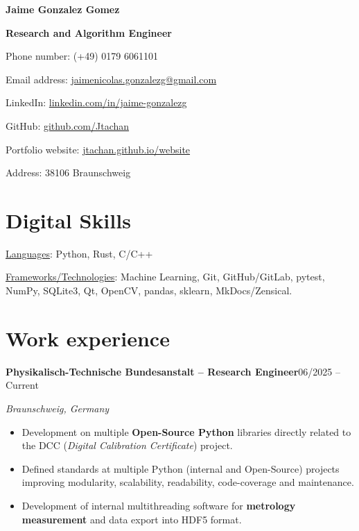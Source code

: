 \documentclass[10pt,a4paper]{article}
\newcommand{\link}[2]{\href{#1}{\textcolor{linkblue}{#2}}}
\newcommand{\entry}[3]{%
  \vspace{0.7em}%
  \textbf{#2}\hfill #1\par
  \textit{#3}\par\vspace{0.1em}}
\begin{document}
{\Large\bfseries Jaime Gonzalez Gomez}\par
{\large\bfseries Research and Algorithm Engineer}\par
\vspace{0.6em}

\begin{minipage}[t]{0.55\textwidth}
Phone number: (+49) 0179 6061101\par
Email address: \link{mailto:jaimenicolas.gonzalezg@gmail.com}{jaimenicolas.gonzalezg@gmail.com}\par
LinkedIn: \link{https://www.linkedin.com/in/jaime-gonzalezg/}{linkedin.com/in/jaime-gonzalezg}
\end{minipage}%
\begin{minipage}[t]{0.45\textwidth}
GitHub: \link{https://github.com/Jtachan}{github.com/Jtachan}\par
Portfolio website: \link{https://jtachan.github.io/website/}{jtachan.github.io/website}\par
Address: 38106 Braunschweig
\end{minipage}

\section{Digital Skills}
\underline{Languages}: Python, Rust, C/C++\par\vspace{0.25em}
\underline{Frameworks/Technologies}: Machine Learning, Git, GitHub/GitLab, pytest, NumPy, SQLite3, Qt, OpenCV, pandas, sklearn, MkDocs/Zensical.

\section{Work experience}

\entry{06/2025 -- Current}{Physikalisch-Technische Bundesanstalt -- Research Engineer}{Braunschweig, Germany}
\begin{itemize}
  \item Development on multiple \textbf{Open-Source Python} libraries directly related to the DCC (\textit{Digital Calibration Certificate}) project.
  \item Defined standards at multiple Python (internal and Open-Source) projects improving modularity, scalability, readability, code-coverage and maintenance.
  \item Development of internal multithreading software for \textbf{metrology measurement} and data export into HDF5 format.
\end{itemize}
\end{document}
